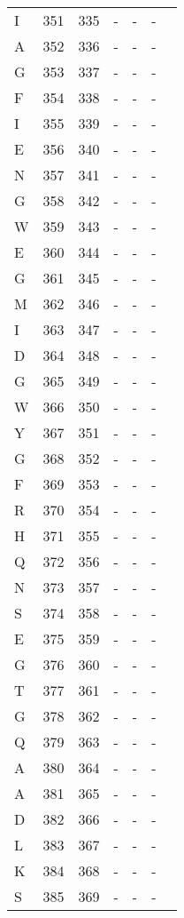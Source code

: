 \documentclass[10pt]{article}
\begin{document}
\begin{longtable}{lllllll}
  I & 351 & 335 & - & - & - &  \\ 
  A & 352 & 336 & - & - & - &  \\ 
  G & 353 & 337 & - & - & - &  \\ 
  F & 354 & 338 & - & - & - &  \\ 
  I & 355 & 339 & - & - & - &  \\ 
  E & 356 & 340 & - & - & - &  \\ 
  N & 357 & 341 & - & - & - &  \\ 
  G & 358 & 342 & - & - & - &  \\ 
  W & 359 & 343 & - & - & - &  \\ 
  E & 360 & 344 & - & - & - &  \\ 
  G & 361 & 345 & - & - & - &  \\ 
  M & 362 & 346 & - & - & - &  \\ 
  I & 363 & 347 & - & - & - &  \\ 
  D & 364 & 348 & - & - & - &  \\ 
  G & 365 & 349 & - & - & - &  \\ 
  W & 366 & 350 & - & - & - &  \\ 
  Y & 367 & 351 & - & - & - &  \\ 
  G & 368 & 352 & - & - & - &  \\ 
  F & 369 & 353 & - & - & - &  \\ 
  R & 370 & 354 & - & - & - &  \\ 
  H & 371 & 355 & - & - & - &  \\ 
  Q & 372 & 356 & - & - & - &  \\ 
  N & 373 & 357 & - & - & - &  \\ 
  S & 374 & 358 & - & - & - &  \\ 
  E & 375 & 359 & - & - & - &  \\ 
  G & 376 & 360 & - & - & - &  \\ 
  T & 377 & 361 & - & - & - &  \\ 
  G & 378 & 362 & - & - & - &  \\ 
  Q & 379 & 363 & - & - & - &  \\ 
  A & 380 & 364 & - & - & - &  \\ 
  A & 381 & 365 & - & - & - &  \\ 
  D & 382 & 366 & - & - & - &  \\ 
  L & 383 & 367 & - & - & - &  \\ 
  K & 384 & 368 & - & - & - &  \\ 
  S & 385 & 369 & - & - & - &  \\ 

\end{longtable}
\end{document}
